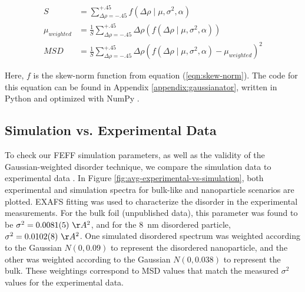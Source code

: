 
\begin{align}
	\label{eqn:updated-weighted-MSD}
	S &= \sum_{\Delta\rho=-.45}^{+.45} f\left(\Delta \rho \mid \mu, \sigma^2, \alpha \right) \\
	\mu_{weighted} &= \frac{1}{S} \sum_{\Delta\rho=-.45}^{+.45} \Delta\rho \left( f ( \Delta \rho \mid \mu, \sigma^2, \alpha ) \right) \\
	MSD &= \frac{1}{S} \sum_{\Delta\rho=-.45}^{+.45} \Delta \rho \left( f ( \Delta \rho \mid \mu, \sigma^2, \alpha ) - \mu_{weighted} \right) ^2
\end{align}

\noindent Here, $ f $ is the skew-norm function from equation (\ref{eqn:skew-norm}). The code for this equation can be found in Appendix \ref{appendix:gaussianator}, written in Python and optimized with NumPy \cite{numpy}.

\subsection{Simulation vs. Experimental Data} \label{sec:end-disorder}

To check our FEFF simulation parameters, as well as the validity of the Gaussian-weighted disorder technique, we compare the simulation data to experimental data \cite{au-nanowires-silca-wang} \cite{crooks-55nm-au-exp} \cite{jing-au-nanoparticle-exp}. In Figure \ref{fig:avg-experimental-vs-simulation}, both experimental and simulation spectra for bulk-like and nanoparticle scenarios are plotted. EXAFS fitting was used to characterize the disorder in the experimental measurements. For the bulk foil (unpublished data), this parameter was found to be $ \sigma^2=0.0081(5)~\AA^2 $, and for the 8~nm disordered particle, $ \sigma^2=0.0102(8)~\AA^2 $.  One simulated disordered spectrum was weighted according to the Gaussian $ N(0, 0.09) $ to represent the disordered nanoparticle, and the other was weighted according to the Gaussian $ N(0, 0.038)  $ to represent the bulk. These weightings correspond to MSD values that match the measured $ \sigma^2 $ values for the experimental data.  

